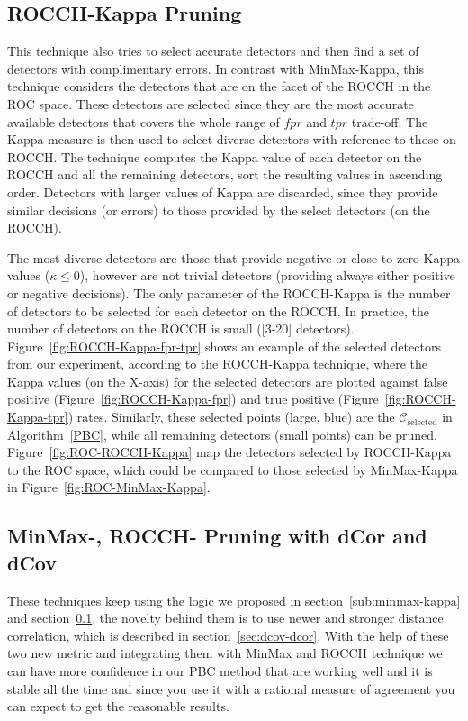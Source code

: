 \subsection{ROCCH-Kappa Pruning}
\label{sub:rocch-kappa}

This technique also tries to select accurate detectors and then find a set of detectors with complimentary errors.
In contrast with MinMax-Kappa, this technique considers the detectors that are on the facet of the ROCCH in the ROC space.
These detectors are selected since they are the most accurate available detectors that covers the whole range of $fpr$ and $tpr$ trade-off.
The Kappa measure is then used to select diverse detectors with reference to those on ROCCH.
The technique computes the Kappa value of each detector on the ROCCH and all the remaining detectors, sort the resulting values in ascending order.
Detectors with larger values of Kappa are discarded, since they provide similar decisions (or errors) to those provided by the select detectors (on the ROCCH).

The most diverse detectors are those that provide negative or close to zero Kappa values ($\kappa \leq 0$), however are not trivial detectors (providing always either positive or negative decisions).
The only parameter of the ROCCH-Kappa is the number of detectors to be selected for each detector on the ROCCH.
In practice, the number of detectors on the ROCCH is small ([3-20] detectors).
Figure~\ref{fig:ROCCH-Kappa-fpr-tpr} shows an example of the selected detectors from our experiment, according to the ROCCH-Kappa technique, where the Kappa values (on the X-axis) for the selected detectors are plotted against false positive (Figure~\ref{fig:ROCCH-Kappa-fpr}) and true positive  (Figure~\ref{fig:ROCCH-Kappa-tpr}) rates.
Similarly, these selected points (large, blue) are the $\mathcal{C}_{\mbox{selected}}$ in Algorithm~\ref{PBC}, while all remaining detectors (small points) can be pruned.
Figure~\ref{fig:ROC-ROCCH-Kappa} map the detectors selected by ROCCH-Kappa to the ROC space, which could be compared to those selected by MinMax-Kappa in Figure~\ref{fig:ROC-MinMax-Kappa}.

\subsection{MinMax-, ROCCH- Pruning with dCor and dCov}
\label{sub:minmax-rocch-dcov}
These techniques keep using the logic we proposed in section~\ref{sub:minmax-kappa} and section~\ref{sub:rocch-kappa}, the novelty behind them is to use newer and stronger distance correlation, which is described in section~\ref{sec:dcov-dcor}. With the help of these two new metric and integrating them with MinMax and ROCCH technique we can have more confidence in our PBC method that are working well and it is stable all the time and since you use it with a rational measure of agreement you can expect to get the reasonable results.

